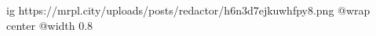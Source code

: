  
 
 
 
 

\ifcmt
  ig https://mrpl.city/uploads/posts/redactor/h6n3d7ejkuwhfpy8.png
  @wrap center
  @width 0.8
\fi
